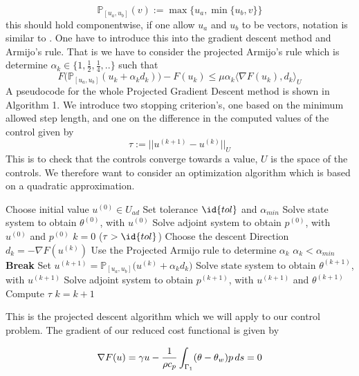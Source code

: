 \begin{equation}
    \label{eq:projection}
    \mathbb{P}_{[u_a,u_b]}(v) := \max \{u_a, \min \{u_b,v \} \}
\end{equation}
this should hold componentwise, if one allow $u_a$ and $u_b$ to be vectors, notation is similar to \cite{Algorithms}. One have to introduce this into the gradient descent method and Armijo's rule. That is we have to consider the projected Armijo's rule which is determine $\alpha_k \in \{1, \frac{1}{2},\frac{1}{4},.. \}$ such that 
\begin{equation*}
    F \bigg (\mathbb{P}_{[u_a,u_b]}(u_k + \alpha_kd_k) \bigg ) - F(u_k) \leq \mu \alpha_k \langle \nabla F(u_k),d_k \rangle_{U}
\end{equation*}
A pseudocode for the whole Projected Gradient Descent method is shown in Algorithm 1. We introduce two stopping criterion's, one based on the minimum allowed step length, and one on the difference in the computed values of the control given by 
\begin{equation}
    \label{eq:stopping}
    \tau := ||u^{(k+1)} - u^{(k)}||_U 
\end{equation}
This is to check that the controls converge towards a value, $U$ is the space of the controls. We therefore want to consider an optimization algorithm which is based on a quadratic approximation. 

\begin{codebox}
\li Choose initial value $u^{(0)}\in U_{ad}$
\li Set tolerance $\id{tol}$ and $\alpha_{min}$
\li Solve state system to obtain $\theta^{(0)}$, with $u^{(0)}$
\li Solve adjoint system to obtain $p^{(0)}$, with $u^{(0)}$ and $p^{(0)}$
\li $k=0$
\li \While ($\tau > \id{tol}$)  \Then
\li Choose the descent Direction $d_k = -\nabla F(u^{(k)})$
\li Use the Projected Armijo rule to determine $\alpha_k$
\li \If $\alpha_k < \alpha_{min}$ \Then 
\li \textbf{Break} \End
\li Set $u^{(k+1)} = \mathbb{P}_{[u_a,u_b]}\bigg (u^{(k)} + \alpha_k d_k \bigg )$
\li Solve state system to obtain $\theta^{(k+1)}$, with $u^{(k+1)}$
\li Solve adjoint system to obtain $p^{(k+1)}$, with $u^{(k+1)}$ and $\theta^{(k+1)}$
\li Compute $\tau$
\li $k = k +1$
\end{codebox}
This is the projected descent algorithm which we will apply to our control problem. The gradient of our reduced cost functional is given by

\begin{equation*}
    \nabla F(u) =  \gamma u - \frac{1}{\rho c_p} \int_{\Gamma_1} (\theta - \theta_w)p \mathop{ds} = 0
\end{equation*}

